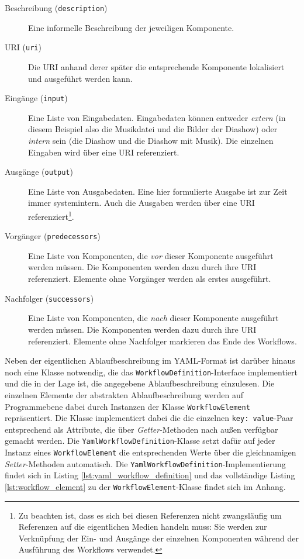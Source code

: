   \begin{description}
    \item[Beschreibung (\texttt{description})] Eine informelle Beschreibung der jeweiligen Komponente.
    \item[URI (\texttt{uri})] Die URI anhand derer später die entsprechende Komponente lokalisiert und ausgeführt werden kann.
    \item[Eingänge (\texttt{input})] Eine Liste von Eingabedaten. Eingabedaten können entweder \emph{extern} (in diesem Beispiel also die Musikdatei und die Bilder der Diashow) oder \emph{intern} sein (die Diashow und die Diashow mit Musik). Die einzelnen Eingaben wird über eine URI referenziert.
    \item[Ausgänge (\texttt{output})] Eine Liste von Ausgabedaten. Eine hier formulierte Ausgabe ist zur Zeit immer systemintern. Auch die Ausgaben werden über eine URI referenziert\footnote{Zu beachten ist, dass es sich bei diesen Referenzen nicht zwangsläufig um Referenzen auf die eigentlichen Medien handeln muss: Sie werden zur Verknüpfung der Ein- und Ausgänge der einzelnen Komponenten während der Ausführung des Workflows verwendet.}.
    \item[Vorgänger (\texttt{predecessors})] Eine Liste von Komponenten, die \emph{vor} dieser Komponente ausgeführt werden müssen. Die Komponenten werden dazu durch ihre URI referenziert. Elemente ohne Vorgänger werden als erstes ausgeführt.
    \item[Nachfolger (\texttt{successors})] Eine Liste von Komponenten, die \emph{nach} dieser Komponente ausgeführt werden müssen. Die Komponenten werden dazu durch ihre URI referenziert. Elemente ohne Nachfolger markieren das Ende des Workflows.
  \end{description}

  Neben der eigentlichen Ablaufbeschreibung im YAML-Format ist darüber hinaus noch eine Klasse notwendig, die das \verb!WorkflowDefinition!-Interface implementiert und die in der Lage ist, die angegebene Ablaufbeschreibung einzulesen. Die einzelnen Elemente der abstrakten Ablaufbeschreibung werden auf Programmebene dabei durch Instanzen der Klasse \verb!WorkflowElement! repräsentiert. Die Klasse implementiert dabei die die einzelnen \verb!key: value!-Paar entsprechend als Attribute, die über \emph{Getter}-Methoden nach außen verfügbar gemacht werden. Die \verb!YamlWorkflowDefinition!-Klasse setzt dafür auf jeder Instanz eines \verb!WorkflowElement! die entsprechenden Werte über die gleichnamigen \emph{Setter}-Methoden automatisch. Die \verb!YamlWorkflowDefinition!-Implementierung findet sich in Listing \ref{lst:yaml_workflow_definition} und das vollständige Listing \ref{lst:workflow_element} zu der \verb!WorkflowElement!-Klasse findet sich im Anhang.


